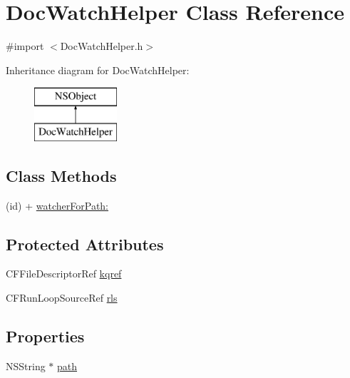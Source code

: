 \hypertarget{interface_doc_watch_helper}{\section{Doc\-Watch\-Helper Class Reference}
\label{interface_doc_watch_helper}
}


{\ttfamily \#import $<$Doc\-Watch\-Helper.\-h$>$}

Inheritance diagram for Doc\-Watch\-Helper\-:\begin{figure}[H]
\begin{center}
\leavevmode
\includegraphics[height=2.000000cm]{interface_doc_watch_helper}
\end{center}
\end{figure}
\subsection*{Class Methods}
\begin{DoxyCompactItemize}
\item 
(id) + \hyperlink{interface_doc_watch_helper_acca9e57456a61b480bd1ff447b1c6acb}{watcher\-For\-Path\-:}
\end{DoxyCompactItemize}
\subsection*{Protected Attributes}
\begin{DoxyCompactItemize}
\item 
C\-F\-File\-Descriptor\-Ref \hyperlink{interface_doc_watch_helper_ae31fc9698a931893f4b4e41ebba1cd8c}{kqref}
\item 
C\-F\-Run\-Loop\-Source\-Ref \hyperlink{interface_doc_watch_helper_a84a27517af046174618d763182acac6a}{rls}
\end{DoxyCompactItemize}
\subsection*{Properties}
\begin{DoxyCompactItemize}
\item 
N\-S\-String $\ast$ \hyperlink{interface_doc_watch_helper_a3bcb67415de88a91a9a0b284dbdbacc8}{path}
\end{DoxyCompactItemize}


